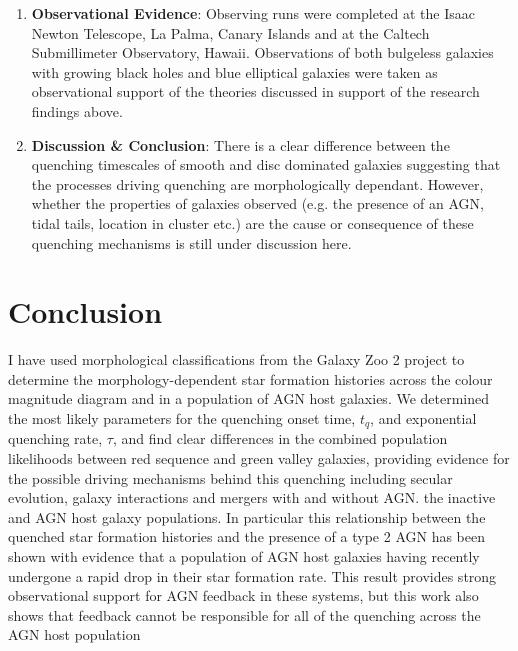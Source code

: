 \documentclass[useAMS,usenatbib]{mn2e}
\begin{document}
\begin{enumerate}[I]
\item{{\bf Observational Evidence}: Observing runs were completed at the Isaac Newton Telescope, La Palma, Canary Islands and at the Caltech Submillimeter Observatory, Hawaii. Observations of both bulgeless galaxies with growing black holes and blue elliptical galaxies were taken as observational support of the theories discussed in support of the research findings above.} 

\item{{\bf Discussion \& Conclusion}: There is a clear difference between the quenching timescales of smooth and disc dominated galaxies suggesting that the processes driving quenching are morphologically dependant. However, whether the properties of galaxies observed (e.g. the presence of an AGN, tidal tails, location in cluster etc.) are the cause or consequence of these quenching mechanisms is still under discussion here.}
\end{enumerate}


\section{Conclusion}
I have used morphological classifications from the Galaxy Zoo 2 project to determine the morphology-dependent star formation histories across the colour magnitude diagram and in a population of AGN host galaxies. We determined the most likely parameters for the quenching onset time, $t_q$, and exponential quenching rate, $\tau$, and find clear differences in the combined population likelihoods between red sequence and green valley galaxies, providing evidence for the possible driving mechanisms behind this quenching including secular evolution, galaxy interactions and mergers with and without AGN. the  inactive and AGN host galaxy populations. In particular this relationship between the quenched star formation histories and the presence of a type 2 AGN has been shown with evidence that a population of AGN host galaxies having recently undergone a rapid drop in their star formation rate. This result provides strong observational support for AGN feedback in these systems, but this work also shows that feedback cannot be responsible for all of the quenching across the AGN host population
\end{document}
